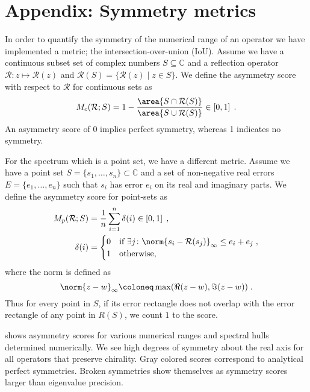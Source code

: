 \chapter{Appendix: Symmetry metrics}
\label{ch:appendix:symmetries}
\label{ch:appendix:D}


In order to quantify the symmetry of the numerical range of an operator we have implemented a metric; the intersection-over-union (IoU).
Assume we have a continuous subset set of complex numbers $S \subseteq \mathbb{C}$ and a reflection operator $\mathcal{R} \colon z \mapsto \mathcal{R}(z)$ and $\mathcal{R}(S) = \{ \mathcal{R}(z) \mid z \in S \} $.
We define the asymmetry score with respect to $\mathcal{R}$ for continuous sets as
\begin{equation} \label{eq:asymmetry:score:cont}
M_c(\mathcal{R}; S)
= 1-
\frac{\area{ S \cap \mathcal{R}(S) }}
     {\area{ S \cup \mathcal{R}(S) }}
\in \left[ 0, 1 \right] \;.
\end{equation}
An asymmetry score of \num{0} implies perfect symmetry, whereas \num{1} indicates no symmetry.

For the spectrum which is a point set, we have a different metric.
Assume we have a point set $S = \{s_1, \ldots, s_n\} \subset \mathbb{C}$ and a set of non-negative real errors $E = \{e_1, \ldots, e_n\}$ such that $s_i$ has error $e_i$ on its real and imaginary parts.
We define the asymmetry score for point-sets as
\begin{align} \label{eq:asymmetry:score:pt}
M_p(\mathcal{R}; S) &= \frac{1}{n} \sum_{i=1}^{n} \delta(i)
\in \left[ 0, 1 \right] \;, \\
\delta(i) &=
\begin{cases}
    0 & \text{if } \exists j \colon \norm{s_i - \mathcal{R}(s_j)}_{\infty} \leq e_i+e_j \;, \\
    1 & \text{otherwise,}
\end{cases}
\end{align}
where the norm is defined as
\begin{equation}
\norm{z - w}_{\infty} \coloneq \max(\Re(z - w), \Im(z - w)) \;.
\end{equation}
Thus for every point in $S$, if its error rectangle does not overlap with the error rectangle of any point in $R(S)$, we count $1$ to the score.

 shows asymmetry scores for various numerical ranges and spectral hulls determined numerically.
We see high degrees of symmetry about the real axis for all operators that preserve chirality.
Gray colored scores correspond to analytical perfect symmetries.
Broken symmetries show themselves as symmetry scores larger than eigenvalue precision.

